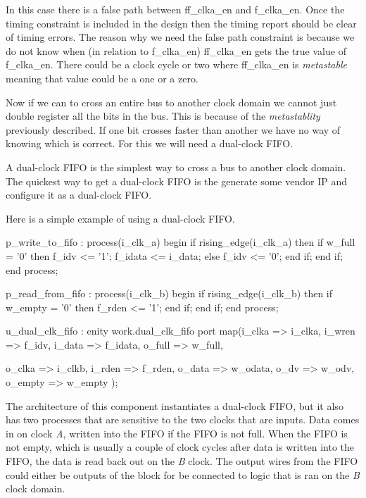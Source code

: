 In this case there is a false path between ff\_clka\_en and f\_clka\_en. Once the timing constraint is included in the design then the timing report should be clear of timing errors. The reason why we need the false path constraint is because we do not know when (in relation to f\_clka\_en) ff\_clka\_en gets the true value of f\_clka\_en. There could be a clock cycle or two where ff\_clka\_en is \emph{metastable} meaning that value could be a one or a zero. 

Now if we can to cross an entire bus to another clock domain we cannot just double register all the bits in the bus. This is because of the \emph{metastablity} previously described. If one bit crosses faster than another we have no way of knowing which is correct. For this we will need a dual-clock \ac{FIFO}. 

A dual-clock \ac{FIFO} is the simplest way to cross a bus to another clock domain. The quickest way to get a dual-clock \ac{FIFO} is the generate some vendor \ac{IP} and configure it as a dual-clock \ac{FIFO}. 

Here is a simple example of using a dual-clock \ac{FIFO}.

\begin{VHDLlisting}[tabsize=4]
p_write_to_fifo : process(i_clk_a)
begin
    if rising_edge(i_clk_a) then
        if w_full = '0' then
            f_idv <= '1';
            f_idata <= i_data;
        else
            f_idv <= '0';
        end if;
    end if;	
end process;

p_read_from_fifo : process(i_clk_b)
begin	
    if rising_edge(i_clk_b) then
        if w_empty = '0' then
            f_rden <= '1';
        end if;
    end if;
end process;

u_dual_clk_fifo : enity work.dual_clk_fifo
port map(i_clka  => i_clka, 
         i_wren  => f_idv,
         i_data  => f_idata,
         o_full  => w_full,
         
         o_clka  => i_clkb,
         i_rden  => f_rden,
         o_data  => w_odata,
         o_dv    => w_odv,
         o_empty => w_empty
);
\end{VHDLlisting}

The architecture of this component instantiates a dual-clock \ac{FIFO}, but it also has two processes that are sensitive to the two clocks that are inputs. Data comes in on clock \emph{A}, written into the \ac{FIFO} if the \ac{FIFO} is not full. When the \ac{FIFO} is not empty, which is usually a couple of clock cycles after data is written into the \ac{FIFO}, the data is read back out on the \emph{B} clock. The output wires from the \ac{FIFO} could either be outputs of the block for be connected to logic that is ran on the \emph{B} clock domain. 

